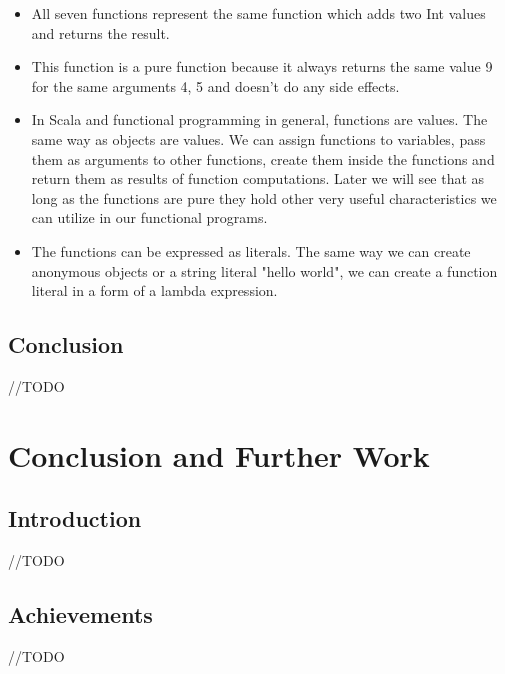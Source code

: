 \documentclass[12pt,twoside,a4paper]{report}
\begin{document}
\begin{itemize}\itemsep1pt \parskip0pt 
\item All seven functions represent the same function which adds two Int values and returns the result.
\item This function is a pure function because it always returns the same value 9 for the same arguments 4, 5 and doesn't do any side effects.
\item In Scala and functional programming in general, functions are values. The same way as objects are values. We can assign functions to variables, pass them as arguments to other functions, create them inside the functions and return them as results of function computations. Later we will see that as long as the functions are pure they hold other very useful characteristics we can utilize in our functional programs.
\item The functions can be expressed as literals. The same way we can create anonymous objects or a string literal "hello world", we can create a function literal in a form of a lambda expression.
\end{itemize}

\section{Conclusion}\label{6.10}
//TODO











\chapter{Conclusion and Further Work}\label{7}

\section{Introduction}\label{7.1}
//TODO

\section{Achievements}\label{7.2}
//TODO
\end{document}
